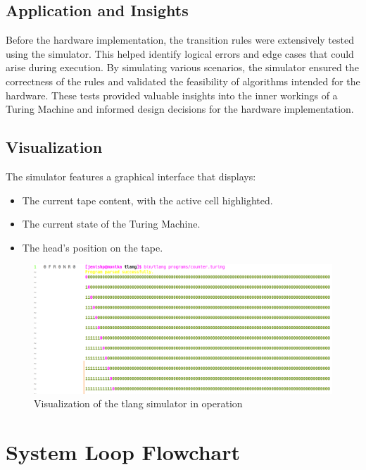 \subsection{Application and Insights}

Before the hardware implementation, the transition rules were extensively tested using the simulator. This helped identify logical errors and edge cases that could arise during execution. By simulating various scenarios, the simulator ensured the correctness of the rules and validated the feasibility of algorithms intended for the hardware. These tests provided valuable insights into the inner workings of a Turing Machine and informed design decisions for the hardware implementation.

\subsection{Visualization}

The simulator features a graphical interface that displays:
\begin{itemize}
    \item The current tape content, with the active cell highlighted.
    \item The current state of the Turing Machine.
    \item The head's position on the tape.
\end{itemize}

\begin{figure}[h!]
    \centering
    \includegraphics[width=1\textwidth]{content/images/tlang.png}
    \caption{Visualization of the tlang simulator in operation}
    \label{fig:emulatorScreenshot}
\end{figure}

\section{System Loop Flowchart}

